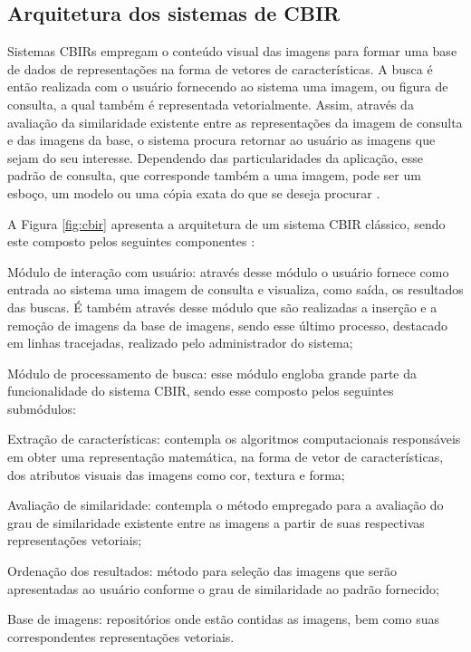 \subsection{Arquitetura dos sistemas de \acl{CBIR}}

Sistemas \acp{CBIR} empregam o conteúdo visual das imagens para formar uma base de dados de representações na forma de vetores de características. A busca é então realizada com o usuário fornecendo ao sistema uma imagem, ou figura de consulta, a qual também é representada vetorialmente. Assim, através da avaliação da similaridade existente entre as representações da imagem de consulta e das imagens da base, o sistema procura retornar ao usuário as imagens que sejam do seu interesse. Dependendo das particularidades da aplicação, esse padrão de consulta, que corresponde também a uma imagem, pode ser um esboço, um modelo ou uma cópia exata do que se deseja procurar \cite{Smeulders:2000}.

\begin{comment}
Sistemas \emph{CBIR} realizam buscas em bases multimídia utilizando o conteúdo visual das imagens, visando recuperar imagens que sejam do interesse do usuário mediante um padrão de consulta especificado. O campo das pesquisas em recuperação de imagens pelo conteúdo é vasto e relativamente recente.
\end{comment}


A Figura \ref{fig:cbir} apresenta a arquitetura de um sistema \ac{CBIR} clássico, sendo este composto pelos seguintes componentes \cite{Torres:2006}:

\begin{alineas}
\item Módulo de interação com usuário: através desse módulo o usuário fornece como entrada ao sistema uma imagem de consulta e visualiza, como saída, os resultados das buscas. É também através desse módulo que são realizadas a inserção e a remoção de imagens da base de imagens, sendo esse último processo, destacado em linhas tracejadas, realizado pelo administrador do sistema;  
\item Módulo de processamento de busca: esse módulo engloba grande parte da funcionalidade do sistema \ac{CBIR}, sendo esse composto pelos seguintes submódulos:
\begin{alineas}
\item Extração de características: contempla os algoritmos computacionais responsáveis em obter uma representação matemática, na forma de vetor de características, dos atributos visuais das imagens como cor, textura e forma;
\item Avaliação de similaridade: contempla o método empregado para a avaliação do grau de similaridade existente entre as imagens a partir de suas respectivas representações vetoriais;
\item Ordenação dos resultados: método para seleção das imagens que serão apresentadas ao usuário conforme o grau de similaridade ao padrão fornecido;
\end{alineas} 
\item Base de imagens: repositórios onde estão contidas as imagens, bem como suas correspondentes representações vetoriais.
\end{alineas}

